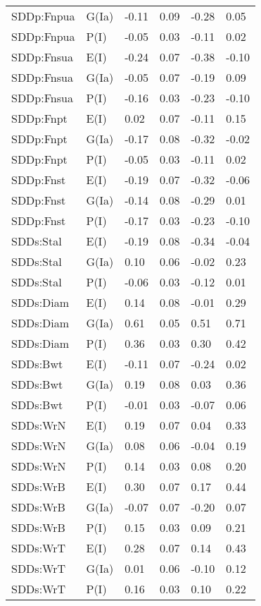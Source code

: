 \begin{center}
\begin{longtable}{|p{1.1in}|p{0.7in}|p{0.7in}|p{0.6in}|p{0.6in}|p{0.6in}|}
  SDDp:Fnpua & G(Ia) & -0.11 & 0.09 & -0.28 & 0.05 \\ 
  SDDp:Fnpua & P(I) & -0.05 & 0.03 & -0.11 & 0.02 \\ 
  SDDp:Fnsua & E(I) & -0.24 & 0.07 & -0.38 & -0.10 \\ 
  SDDp:Fnsua & G(Ia) & -0.05 & 0.07 & -0.19 & 0.09 \\ 
  SDDp:Fnsua & P(I) & -0.16 & 0.03 & -0.23 & -0.10 \\ 
  SDDp:Fnpt & E(I) & 0.02 & 0.07 & -0.11 & 0.15 \\ 
  SDDp:Fnpt & G(Ia) & -0.17 & 0.08 & -0.32 & -0.02 \\ 
  SDDp:Fnpt & P(I) & -0.05 & 0.03 & -0.11 & 0.02 \\ 
  SDDp:Fnst & E(I) & -0.19 & 0.07 & -0.32 & -0.06 \\ 
  SDDp:Fnst & G(Ia) & -0.14 & 0.08 & -0.29 & 0.01 \\ 
  SDDp:Fnst & P(I) & -0.17 & 0.03 & -0.23 & -0.10 \\ 
  SDDs:Stal & E(I) & -0.19 & 0.08 & -0.34 & -0.04 \\ 
  SDDs:Stal & G(Ia) & 0.10 & 0.06 & -0.02 & 0.23 \\ 
  SDDs:Stal & P(I) & -0.06 & 0.03 & -0.12 & 0.01 \\ 
  SDDs:Diam & E(I) & 0.14 & 0.08 & -0.01 & 0.29 \\ 
  SDDs:Diam & G(Ia) & 0.61 & 0.05 & 0.51 & 0.71 \\ 
  SDDs:Diam & P(I) & 0.36 & 0.03 & 0.30 & 0.42 \\ 
  SDDs:Bwt & E(I) & -0.11 & 0.07 & -0.24 & 0.02 \\ 
  SDDs:Bwt & G(Ia) & 0.19 & 0.08 & 0.03 & 0.36 \\ 
  SDDs:Bwt & P(I) & -0.01 & 0.03 & -0.07 & 0.06 \\ 
  SDDs:WrN & E(I) & 0.19 & 0.07 & 0.04 & 0.33 \\ 
  SDDs:WrN & G(Ia) & 0.08 & 0.06 & -0.04 & 0.19 \\ 
  SDDs:WrN & P(I) & 0.14 & 0.03 & 0.08 & 0.20 \\ 
  SDDs:WrB & E(I) & 0.30 & 0.07 & 0.17 & 0.44 \\ 
  SDDs:WrB & G(Ia) & -0.07 & 0.07 & -0.20 & 0.07 \\ 
  SDDs:WrB & P(I) & 0.15 & 0.03 & 0.09 & 0.21 \\ 
  SDDs:WrT & E(I) & 0.28 & 0.07 & 0.14 & 0.43 \\ 
  SDDs:WrT & G(Ia) & 0.01 & 0.06 & -0.10 & 0.12 \\ 
  SDDs:WrT & P(I) & 0.16 & 0.03 & 0.10 & 0.22 \\ 

\end{longtable}
\end{center}
